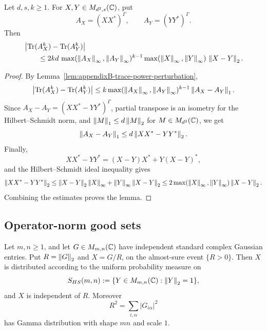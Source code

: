 \begin{lemma}
\label{lem:appendixB-moment-lipschitz}
Let \(d,s,k\ge1\).  For \(X,Y\in M_{d^2,s}(\mathbb{C})\), put
\[
  A_X=(XX^*)^\Gamma,\qquad A_Y=(YY^*)^\Gamma.
\]
Then
\[
\begin{aligned}
&\left|
  \operatorname{Tr}(A_X^k)-\operatorname{Tr}(A_Y^k)
\right|                                                     \\
&\qquad\le
2kd\,
\max(\left\lVert A_X\right\rVert_\infty,\left\lVert A_Y\right\rVert_\infty)^{k-1}
\max(\left\lVert X\right\rVert_\infty,\left\lVert Y\right\rVert_\infty)\,
\left\lVert X-Y\right\rVert_2 .
\end{aligned}
\]
\end{lemma}

\begin{proof}
By Lemma~\ref{lem:appendixB-trace-power-perturbation},
\[
\left|\operatorname{Tr}(A_X^k)-\operatorname{Tr}(A_Y^k)\right|
\le
k\max(\left\lVert A_X\right\rVert_\infty,\left\lVert A_Y\right\rVert_\infty)^{k-1}
\left\lVert A_X-A_Y\right\rVert_1 .
\]
Since \(A_X-A_Y=(XX^*-YY^*)^\Gamma\), partial transpose is an isometry for
the Hilbert--Schmidt norm, and
\(\left\lVert M\right\rVert_1\le d\left\lVert M\right\rVert_2\) for \(M\in M_{d^2}(\mathbb{C})\), we get
\[
  \left\lVert A_X-A_Y\right\rVert_1
  \le d\left\lVert XX^*-YY^*\right\rVert_2.
\]
Finally,
\[
  XX^*-YY^*=(X-Y)X^*+Y(X-Y)^*,
\]
and the Hilbert--Schmidt ideal inequality gives
\[
  \left\lVert XX^*-YY^*\right\rVert_2
  \le
  \left\lVert X-Y\right\rVert_2\left\lVert X\right\rVert_\infty+\left\lVert Y\right\rVert_\infty\left\lVert X-Y\right\rVert_2
  \le
  2\max(\left\lVert X\right\rVert_\infty,\left\lVert Y\right\rVert_\infty)\left\lVert X-Y\right\rVert_2.
\]
Combining the estimates proves the lemma.
\end{proof}

\subsection{Operator-norm good sets}

\begin{lemma}
\label{lem:appendixB-gaussian-polar}
Let \(m,n\ge1\), and let \(G\in M_{m,n}(\mathbb{C})\) have independent standard
complex Gaussian entries.  Put \(R=\left\lVert G\right\rVert_2\) and \(X=G/R\), on the
almost-sure event \(\{R>0\}\).  Then \(X\) is distributed according to the
uniform probability measure on
\[
  S_{HS}(m,n):=\{Y\in M_{m,n}(\mathbb{C}):\left\lVert Y\right\rVert_2=1\},
\]
and \(X\) is independent of \(R\).  Moreover
\[
  R^2=\sum_{i,\alpha}|G_{i\alpha}|^2
\]
has Gamma distribution with shape \(mn\) and scale \(1\).
\end{lemma}

